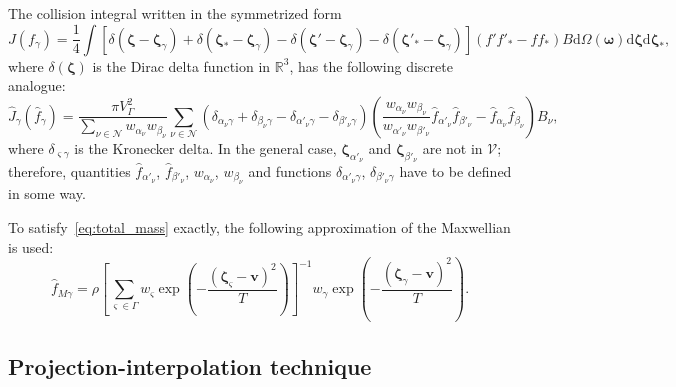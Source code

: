 \documentclass[]{elsarticle} %
\newcommand{\dd}{\mathrm{d}}
\newcommand{\dzeta}{\boldsymbol{\dd\zeta}}
\newcommand{\bzeta}{\boldsymbol{\zeta}}
\newcommand{\Nu}{\mathcal{N}}
\begin{document}
The collision integral written in the symmetrized form
\begin{equation}\label{eq:symm_ci}
    J(f_\gamma) = \frac14\int \left[
        \delta(\bzeta-\bzeta_\gamma) + \delta(\bzeta_*-\bzeta_\gamma)
        - \delta(\bzeta'-\bzeta_\gamma) - \delta(\bzeta'_*-\bzeta_\gamma)\right]
        (f'f'_* - ff_*)B \dd\Omega(\boldsymbol{\omega}) \dzeta\dzeta_*,
\end{equation}
where \(\delta(\bzeta)\) is the Dirac delta function in \(\mathbb{R}^3\),
has the following discrete analogue:
\begin{equation}\label{eq:discrete_symm_ci}
    \hat{J}_\gamma(\hat{f}_\gamma) =
        \frac{\pi V_\Gamma^2}{\sum_{\nu\in\Nu} w_{\alpha_\nu}w_{\beta_\nu}}
        \sum_{\nu\in\Nu} \left(
            \delta_{\alpha_\nu\gamma} + \delta_{\beta_\nu\gamma}
            - \delta_{\alpha'_\nu\gamma} - \delta_{\beta'_\nu\gamma}
        \right)\left(
            \frac{w_{\alpha_\nu}w_{\beta_\nu}}{w_{\alpha'_\nu}w_{\beta'_\nu}}
            \hat{f}_{\alpha'_\nu}\hat{f}_{\beta'_\nu} - \hat{f}_{\alpha_\nu}\hat{f}_{\beta_\nu}
        \right)B_\nu,
\end{equation}
where \(\delta_{\varsigma\gamma}\) is the Kronecker delta.
In the general case, \(\bzeta_{\alpha'_\nu}\) and \(\bzeta_{\beta'_\nu}\) are not in \(\mathcal{V}\);
therefore, quantities \(\hat{f}_{\alpha'_\nu}\), \(\hat{f}_{\beta'_\nu}\), \(w_{\alpha_\nu}\), \(w_{\beta_\nu}\)
and functions \(\delta_{\alpha'_\nu\gamma}\), \(\delta_{\beta'_\nu\gamma}\) have to be defined in some way.

To satisfy~\eqref{eq:total_mass} exactly, the following approximation of the Maxwellian is used:
\begin{equation}\label{eq:discrete_Maxwellian}
    \hat{f}_{M\gamma} = \rho\left[\sum_{\varsigma\in\Gamma}w_\varsigma\exp
            \left(-\frac{(\bzeta_\varsigma - \boldsymbol{v})^2}{T}\right)
        \right]^{-1}
        w_\gamma\exp\left(-\frac{(\bzeta_\gamma - \boldsymbol{v})^2}{T}\right).
\end{equation}

\subsection{Projection-interpolation technique}
\end{document}
